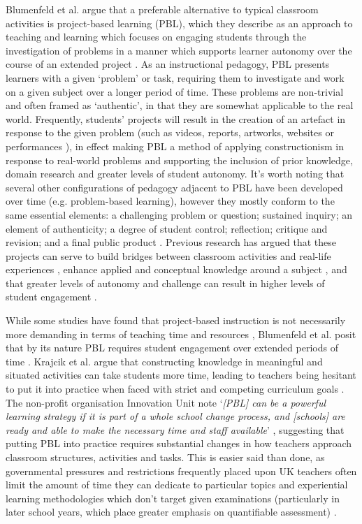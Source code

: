 Blumenfeld et al. argue that a preferable alternative to typical classroom activities is project-based learning (PBL), which they describe as an approach to teaching and learning which focuses on engaging students through the investigation of problems in a manner which supports learner autonomy over the course of an extended project \citep{Blumenfeld1991}. As an instructional pedagogy, PBL presents learners with a given `problem' or task, requiring them to investigate and work on a given subject over a longer period of time. These problems are non-trivial and often framed as `authentic', in that they are somewhat applicable to the real world. Frequently, students' projects will result in the creation of an artefact in response to the given problem (such as videos, reports, artworks, websites or performances \citep{Holubova2008}), in effect making PBL a method of applying constructionism in response to real-world problems and supporting the inclusion of prior knowledge, domain research and greater levels of student autonomy. It's worth noting that several other configurations of pedagogy adjacent to PBL have been developed over time (e.g. problem-based learning), however they mostly conform to the same essential elements: a challenging problem or question; sustained inquiry; an element of authenticity; a degree of student control; reflection; critique and revision; and a final public product \citep{Larmer2015}. Previous research has argued that these projects can serve to build bridges between classroom activities and real-life experiences \citep{Blumenfeld1991}, enhance applied and conceptual knowledge around a subject \citep{Boaler1999}, and that greater levels of autonomy and challenge can result in higher levels of student engagement \citep{Wurdinger2007}.

While some studies have found that project-based instruction is not necessarily more demanding in terms of teaching time and resources \citep{Al-Balushi2014}, Blumenfeld et al. posit that by its nature PBL requires student engagement over extended periods of time \citep{Blumenfeld1991}. Krajcik et al. argue that constructing knowledge in meaningful and situated activities can take students more time, leading to teachers being hesitant to put it into practice when faced with strict and competing curriculum goals \citep{Krajcik2006}. The non-profit organisation Innovation Unit note `\textit{[PBL] can be a powerful learning strategy if it is part of a whole school change process, and [schools] are ready and able to make the necessary time and staff available}' \citep{InnovationUnit2016}, suggesting that putting PBL into practice requires substantial changes in how teachers approach classroom structures, activities and tasks. This is easier said than done, as governmental pressures and restrictions frequently placed upon UK teachers often limit the amount of time they can dedicate to particular topics and experiential learning methodologies which don't target given examinations (particularly in later school years, which place greater emphasis on quantifiable assessment) \citep{Ofsted2018}.

